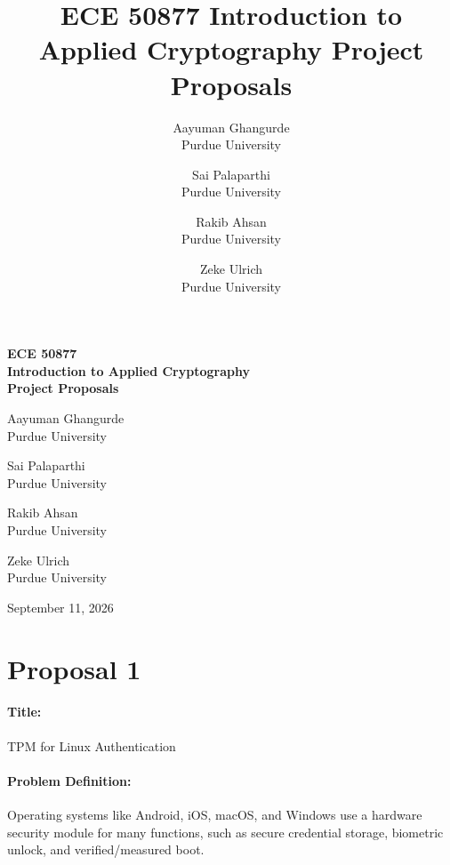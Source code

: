 \documentclass{article}
\title{\Large \bf ECE 50877 Introduction to Applied 
Cryptography Project Proposals}
\author{
    {\rm Aayuman Ghangurde}\\
    Purdue University
    \and
    {\rm Sai Palaparthi}\\
    Purdue University
    \and
    {\rm Rakib Ahsan}\\
    Purdue University
    \and
    {\rm Zeke Ulrich}\\
    Purdue University
}
\begin{document}
\begin{titlepage} 
\centering 
\vspace*{\fill} 
{\Large\bfseries ECE 50877 \\ Introduction to Applied Cryptography\\[0.5em] 
Project Proposals\par} 
\vspace{2cm} 
{\large Aayuman Ghangurde\\ Purdue University \par} \vspace{0.8cm} 
{\large Sai Palaparthi\\ Purdue University \par} \vspace{0.8cm} 
{\large Rakib Ahsan\\ Purdue University \par} \vspace{0.8cm} 
{\large Zeke Ulrich\\ Purdue University \par} 
\vspace{2.5cm} 

{\large September 11, 2026\par}

\vspace*{\fill} 

\end{titlepage}
\newpage

\section*{Proposal 1}


\paragraph{Title:} TPM for Linux Authentication 

\paragraph{Problem Definition:} Operating systems like Android, iOS, macOS, and Windows
use a hardware security module for many functions, such as secure credential storage,
biometric unlock, and verified/measured boot.
\end{document}
